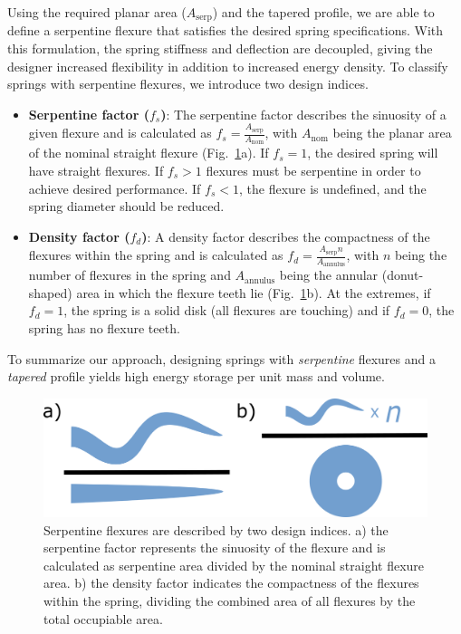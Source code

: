 \documentclass[letterpaper, 10 pt, conference]{ieeeconf} %
\begin{document}
Using the required planar area ($A_{\mathrm{serp}}$) and the tapered profile, we are able to define a serpentine flexure that satisfies the desired spring specifications. With this formulation, the spring stiffness and deflection are decoupled, giving the designer increased flexibility in addition to increased energy density. To classify springs with serpentine flexures, we introduce two design indices. \begin{itemize}
    \item \textbf{Serpentine factor ($f_s$)}: The serpentine factor describes the sinuosity of a given flexure and is calculated as $f_s = \frac{A_{\mathrm{serp}}}{A_{\mathrm{nom}}}$, with $A_{\mathrm{nom}}$ being the planar area of the nominal straight flexure (Fig.~\ref{fig:indices}a). If $f_s = 1$, the desired spring will have straight flexures. If $f_s > 1$ flexures must be serpentine in order to achieve desired performance. If $f_s < 1$, the flexure is undefined, and the spring diameter should be reduced.

    \item \textbf{Density factor ($f_d$)}: A density factor describes the compactness of the flexures within the spring and is calculated as $f_d = \frac{A_{\mathrm{serp}}n}{A_{\mathrm{annulus}}}$, with $n$ being the number of flexures in the spring and ${A_{\mathrm{annulus}}}$ being the annular (donut-shaped) area in which the flexure teeth lie (Fig.~\ref{fig:indices}b). At the extremes, if $f_d = 1$, the spring is a solid disk (all flexures are touching) and if $f_d = 0$, the spring has no flexure teeth.
    \end{itemize}

To summarize our approach, designing springs with \textit{serpentine} flexures and a \textit{tapered} profile yields high energy storage per unit mass and volume.
\begin{figure}[t!]
    \centering
    \includegraphics[width=\columnwidth]{figs/indices.png}
    \caption{Serpentine flexures are described by two design indices. a) the serpentine factor represents the sinuosity of the flexure and is calculated as serpentine area divided by the nominal straight flexure area. b) the density factor indicates the compactness of the flexures within the spring, dividing the combined area of all flexures by the total occupiable area.}
    \label{fig:indices}
\end{figure}
\end{document}
